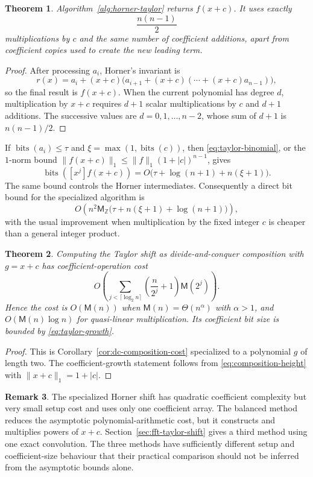\documentclass[11pt]{book}
\newtheorem{theorem}{Theorem}[section]
\theoremstyle{definition}
\newtheorem{remark}[theorem]{Remark}
\newcommand{\ZZ}{\mathbb Z}
\newcommand{\bits}{\operatorname{bits}}
\newcommand{\MZ}{\mathsf M_{\ZZ}}
\begin{document}
\begin{theorem}\label{thm:horner-taylor}
Algorithm~\ref{alg:horner-taylor} returns $f(x+c)$.  It uses exactly
\[
 \frac{n(n-1)}2
\]
multiplications by $c$ and the same number of coefficient additions, apart
from coefficient copies used to create the new leading term.
\end{theorem}

\begin{proof}
After processing $a_i$, Horner's invariant is
\[
 r(x)=a_i+(x+c)\bigl(a_{i+1}+(x+c)(\cdots+(x+c)a_{n-1})\bigr),
\]
so the final result is $f(x+c)$.  When the current polynomial has degree $d$,
multiplication by $x+c$ requires $d+1$ scalar multiplications by $c$ and
$d+1$ additions.  The successive values are $d=0,1,\ldots,n-2$, whose sum
of $d+1$ is $n(n-1)/2$.
\end{proof}

If $\bits(a_i)\le\tau$ and $\xi=\max(1,\bits(c))$, then
\eqref{eq:taylor-binomial}, or the $1$-norm bound
$\|f(x+c)\|_1\le\|f\|_1(1+|c|)^{n-1}$, gives
\begin{equation}\label{eq:taylor-growth}
 \bits([x^j]f(x+c))=O\bigl(\tau+\log(n+1)+n(\xi+1)\bigr).
\end{equation}
The same bound controls the Horner intermediates.  Consequently a direct bit
bound for the specialized algorithm is
\[
 O\left(n^2\MZ\bigl(\tau+n(\xi+1)+\log(n+1)\bigr)\right),
\]
with the usual improvement when multiplication by the fixed integer $c$ is
cheaper than a general integer product.

\begin{theorem}\label{thm:dc-taylor}
Computing the Taylor shift as divide-and-conquer composition with $g=x+c$ has
coefficient-operation cost
\[
 O\left(
  \sum_{j<\lceil\log_2n\rceil}
  \left(\frac{n}{2^j}+1\right)\mathsf M(2^j)
 \right).
\]
Hence the cost is $O(\mathsf M(n))$ when
$\mathsf M(n)=\Theta(n^\alpha)$ with $\alpha>1$, and
$O(\mathsf M(n)\log n)$ for quasi-linear multiplication.  Its coefficient
bit size is bounded by \eqref{eq:taylor-growth}.
\end{theorem}

\begin{proof}
This is Corollary~\ref{cor:dc-composition-cost} specialized to a polynomial
$g$ of length two.  The coefficient-growth statement follows from
\eqref{eq:composition-height} with $\|x+c\|_1=1+|c|$.
\end{proof}

\begin{remark}
The specialized Horner shift has quadratic coefficient complexity but very
small setup cost and uses only one coefficient array.  The balanced method
reduces the asymptotic polynomial-arithmetic cost, but it constructs and
multiplies powers of $x+c$.  Section~\ref{sec:fft-taylor-shift} gives a third
method using one exact convolution.  The three methods have sufficiently
different setup and coefficient-size behaviour that their practical comparison
should not be inferred from the asymptotic bounds alone.
\end{remark}
\end{document}
